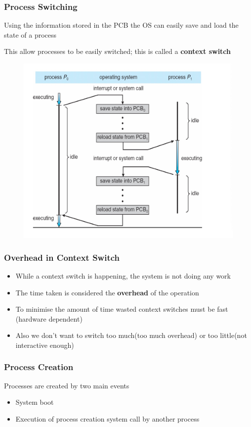 \documentclass[11pt]{article}
\theoremstyle{definition}
\begin{document}
        \subsubsection{Process Switching}
            \item Using the information stored in the PCB the OS can easily save and load the state of a process
            \item This allow processes to be easily switched; this is called a \textbf{context switch}
        \begin{figure}[htbp]
            \centering
                \includegraphics[width=0.68\linewidth]{img/Process_Switching.jpg}
                \label{fig:enter-label}
        \end{figure}
        \subsubsection{Overhead in Context Switch}
            \begin{itemize}
                \item While a context switch is happening, the system is not doing any work
                \item The time taken is considered the \textbf{overhead} of the operation
                \item To minimise the amount of time wasted context switches must be fast (hardware dependent)
                \item Also we don't want to switch too much(too much overhead) or too little(not interactive enough)
            \end{itemize}
        \subsubsection{Process Creation}
        Processes are created by two main events
        \begin{itemize}
            \item System boot
            \item Execution of process creation system call by another process
        \end{itemize}
\end{document}
